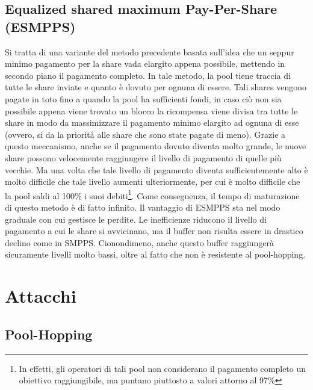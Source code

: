 \subsection{Equalized shared maximum Pay-Per-Share (ESMPPS)}

Si tratta di una variante del metodo precedente basata sull'idea che un seppur minimo pagamento per la share vada elargito appena possibile, mettendo in secondo piano il pagamento completo.
In tale metodo, la pool tiene traccia di tutte le share inviate e quanto è dovuto per ognuna di essere. Tali shares vengono pagate in toto fino a quando la pool ha sufficienti fondi, in caso ciò non sia possibile appena viene trovato un blocco la ricompensa viene divisa tra tutte le share in modo da massimizzare il pagamento minimo elargito ad ognuna di esse (ovvero, si da la priorità alle share che sono state pagate di meno).
Grazie a questo meccanismo, anche se il pagamento dovuto diventa molto grande, le nuove share possono velocemente raggiungere il livello di pagamento di quelle più vecchie. Ma una volta che tale livello di pagamento diventa sufficientemente alto è molto difficile che tale livello aumenti ulteriormente, per cui è molto difficile che la pool saldi al 100\% i suoi debiti\footnote{In effetti, gli operatori di tali pool non considerano il pagamento completo un obiettivo raggiungibile, ma puntano piuttosto a valori attorno al 97\%}. Come conseguenza, il tempo di maturazione di questo metodo è di fatto infinito.
Il vantaggio di ESMPPS sta nel modo graduale con cui gestisce le perdite. Le inefficienze riducono il livello di pagamento a cui le share si avvicinano, ma il buffer non risulta essere in drastico declino come in SMPPS. Cionondimeno, anche questo buffer raggiungerà sicuramente livelli molto bassi, oltre al fatto che non è resistente al pool-hopping.

\section{Attacchi}

\subsection{Pool-Hopping}

